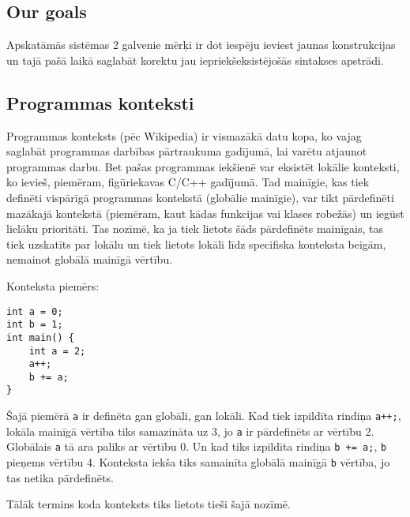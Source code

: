 \documentclass[12pt]{report}
\begin{document}
\subsection{Our goals}
Apskatāmās sistēmas 2 galvenie mērķi ir dot iespēju ieviest jaunas konstrukcijas un tajā pašā laikā saglabāt korektu jau iepriekšeksistējošās sintakses apstrādi.

\subsection{Programmas konteksti}
Programmas konteksts (pēc Wikipedia) ir vismazākā datu kopa, ko vajag saglabāt programmas darbības pārtraukuma gadījumā, lai varētu atjaunot programmas darbu. Bet pašas programmas iekšienē var eksistēt lokālie konteksti, ko ievieš, piemēram, figūriekavas C/C++ gadījumā. Tad mainīgie, kas tiek definēti vispārīgā programmas kontekstā (globālie mainīgie), var tikt pārdefinēti mazākajā kontekstā (piemēram, kaut kādas funkcijas vai klases robežās) un iegūst lielāku prioritāti. Tas nozīmē, ka ja tiek lietots šāds pārdefinēts mainīgais, tas tiek uzskatīts par lokālu un tiek lietots lokāli līdz specifiska konteksta beigām, nemainot globālā mainīgā vērtību.

Konteksta piemērs:
\begin{verbatim}
int a = 0;
int b = 1;
int main() {
	int a = 2;
	a++;
	b += a;
}
\end{verbatim} 
Šajā piemērā \verb|a| ir definēta gan globāli, gan lokāli. Kad tiek izpildīta rindiņa \verb|a++;|, lokāla mainīgā vērtība tiks samazināta uz 3, jo \verb|a| ir pārdefinēts ar vērtību 2. Globālais \verb|a| tā ara paliks ar vērtību 0. Un kad tiks izpildīta rindiņa \verb|b += a;|, \verb|b| pieņems vērtību 4. Konteksta iekša tiks samainīta globālā mainīgā \verb|b| vērtība, jo tas netika pārdefinēts.

Tālāk termins koda konteksts tiks lietots tieši šajā nozīmē. 

{}

\end{document}
